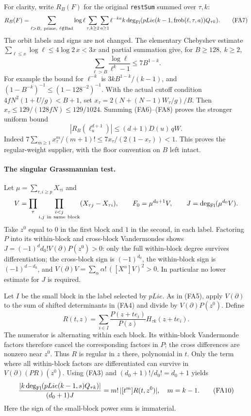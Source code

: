 For clarity, write \(R_B(F)\) for the original
\texttt{restSum} summed over \(\tau,k\):
\[
 R_B(F)=\sum_{\ell>B,\ {\rm prime},\ \ell\notin{\rm Bad}}
 \log\ell\sum_{\tau,k\ge2}\sum_{a\ge1}
 \ell^{-ka} k\deg_{\rm Fl}
       (pLie(k-1,\mathrm{frob}(\ell,\tau,a))Q_{\tau k}).
 \tag{FA7}
\]
The orbit labels and signs are not changed. The elementary
Chebyshev estimate \(\sum_{\ell\le x}\log\ell\le4\log2\,x<3x\)
and partial summation give, for \(B\ge128,\ k\ge2\),
\[
 \sum_{\ell>B}\frac{\log\ell}{\ell^k-1}
 \le 7B^{1-k}.
 \tag{FA8}
\]
For example the bound for \(\ell^{-k}\) is
\(3kB^{1-k}/(k-1)\), and
\((1-B^{-k})^{-1}\le(1-128^{-2})^{-1}\).
With the actual cutoff condition
\(4fN^2(1+U/g)< B+1\), set
\(x_\tau=2(N+(N-1)W_\tau/g)/B\).
Then \(x_\tau\le129/(128 fN)\le129/1024\).
Summing (FA6)--(FA8) proves the stronger uniform bound
\[
 \boxed{\quad |R_B(\ell_u^{d+1})|\le
   (d+1)D(u)\,qW .\quad}
 \tag{FA9}
\]
Indeed \(7\sum_{m\ge1}x_\tau^m/(m+1)!
\le7x_\tau/(2(1-x_\tau))<1\).
This proves the regular-weight supplier, with the floor convention
on \(B\) left intact.

\paragraph{The singular Grassmannian test.}
Let \(\mu=\sum_{\tau,i\ge p}X_{\tau i}\) and
\[
 V=\prod_\tau\prod_{\substack{i<j\\i,j\ {\rm in\ same\ block}}}
       (X_{\tau j}-X_{\tau i}),\qquad F_0=\mu^{d_0+1}V,\qquad
 J=\deg_{\rm Fl}(\mu^{d_0}V).
\]
Take \(z^0\) equal to \(0\) in the first block and \(1\) in the
second, in each label. Factoring \(P\) into its within-block and
cross-block Vandermondes shows
\(J=(-1)^dd_0! V(\partial)P(z^0)>0\):
only the full within-block degree survives differentiation;
the cross-block sign is \((-1)^{d_0}\), the within-block sign
is \((-1)^{d-d_0}\), and \(V(\partial)V=\sum_\alpha
\alpha!\,([X^\alpha]V)^2>0\).
In particular no lower estimate for \(J\) is required.

Let \(I\) be the small block in the label selected by \(pLie\).
As in (FA5), apply \(V(\partial)\) to the sum of shifted
determinants in (FA4) and divide by \(V(\partial)P(z^0)\).
Define
\[
 R(t,z)=\sum_{i\in I}\frac{P(z+t e_i)}{P(z)}
                         H_{\tau k}(z+t e_i).
\]
The numerator is alternating within each block. Its within-block
Vandermonde factors therefore cancel the corresponding factors
in \(P\); the cross differences are nonzero near \(z^0\).
Thus \(R\) is regular in \(z\) there, polynomial in \(t\).
Only the term where all within-block factors are differentiated
can survive in \(V(\partial)(P R)(z^0)\).
Using (FA3) and \((d_0+1)!/d_0!=d_0+1\) yields
\[
 \frac{|k\deg_{\rm Fl}(pLie(k-1,s)Q_{\tau k})|}
 {(d_0+1)J}=m!\,|[t^m]R(t,z^0)|,\quad m=k-1 .
 \tag{FA10}
\]
Here the sign of the small-block power sum is immaterial.

